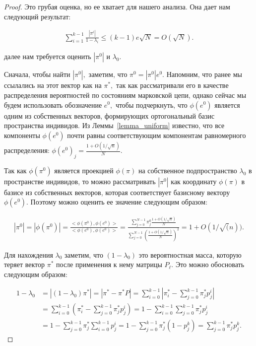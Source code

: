 \documentclass[russian]{article}
\begin{document}
\begin{proof}
Это грубая оценка, но ее хватает для нашего анализа. Она дает нам следующий результат:

\begin{align*}
  \sum\limits_{i = 1}^{k - 1} \frac{|\pi^i|}{1 - \lambda_i} \le (k - 1)e\sqrt{N} = O(\sqrt{N}).
\end{align*}

далее нам требуется оценить $|\pi^0|$ и $\lambda_0$.

Сначала, чтобы найти $|\pi^0|,$ заметим, что $\pi^0 = |\pi^0|e^0.$ Напомним, что ранее мы ссылались на этот вектор как на $\pi^*,$ так как рассматривали его в качестве распределения вероятностей по состояниям марковской цепи, однако сейчас мы будем использовать обозначение $e^0,$ чтобы подчеркнуть, что $\phi(e^0)$ является одним из собственных векторов, формирующих ортогональный базис пространства индивидов. Из Леммы~\ref{lemma_uniform} известно, что все компоненты $\phi(e^0)$ почти равны соответствующим компонентам равномерного распределения: $\phi(e^0)_j = \frac{1 + O(1/\sqrt{n})}{N}.$

Так как $\phi(\pi^0)$ является проекцией $\phi(\pi)$ на собственное подпространство $\lambda_0$  в пространстве индивидов, то можно рассматривать $|\pi^0|$ как координату $\phi(\pi)$ в базисе из собственных векторов, которая соответствует базисному вектору $\phi(e^0).$ Поэтому можно оценить ее значение следующим образом:

\begin{align*}
  |\pi^0| = |\phi(\pi^0)| = \frac{<\phi(\pi^0), \phi(e^0)>}{<\phi(e^0), \phi(e^0)>} = \frac{\sum\limits_{j = 0}^{N - 1} \pi_j^0 \frac{1 + O(1/\sqrt{n})}{N}}{\sum\limits_{j = 0}^{N - 1} \left( \frac{1 + O(1/\sqrt{n})}{N}\right)^2} = 1 + O(1/\sqrt(n)).
\end{align*}

Для нахождения $\lambda_0$ заметим, что $(1 - \lambda_0)$ это вероятностная масса, которую теряет вектор $\pi^*$ после применения к нему матрицы $P_\ell.$ Это можно обосновать следующим образом:

\begin{align*}
  1 - \lambda_0 &= |(1 - \lambda_0)\pi^*| = |\pi^* - \pi^* P| = \sum\limits_{i = 0}^{k - 1} |\pi_i^* - \sum\limits_{j = 0}^{k - 1} \pi_j^* p_j^i| \\
  &= \sum\limits_{i = 0}^{k - 1} (\pi_i^* - \sum\limits_{j = 0}^{k - 1} \pi_j^* p_j^i) = 1 - \sum\limits_{i = 0}^{k - 1} \sum\limits_{j = 0}^{k - 1} \pi_j^* p_j^i \\
  &= 1 - \sum\limits_{j = 0}^{k - 1} \pi_j^* \sum\limits_{i = 0}^{k - 1} p_j^i = 1 - \sum\limits_{j = 0}^{k - 1} \pi_j^* (1 - p_j^k) = \sum\limits_{j = 0}^{k - 1} \pi_j^* p_j^k.
\end{align*}


\end{proof}
\end{document}

